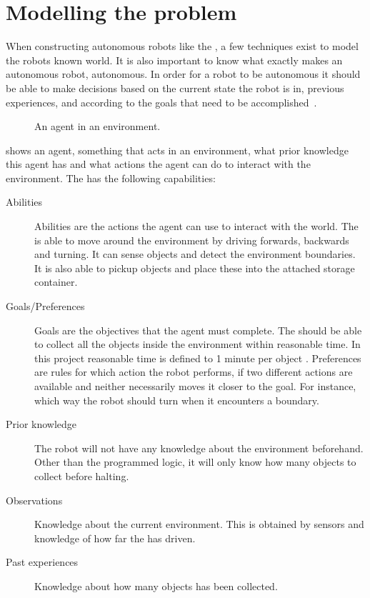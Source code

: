 \section{Modelling the problem} \label{sec:model}

When constructing autonomous robots like the \projname{}, a few techniques exist to model the robots known world. It is also important to know what exactly makes an autonomous robot, autonomous. In order for a robot to be autonomous it should be able to make decisions based on the current state the robot is in, previous experiences, and according to the goals that need to be accomplished~\citep{artificialintelligencebook}. 

\begin{figure}[H]
     \caption{\label{fig:model_mi_agent} An agent in an environment.}
\end{figure}

 shows an agent, something that acts in an environment, what prior knowledge this agent has and what actions the agent can do to interact with the environment. The \projname{} has the following capabilities:

\begin{description}
\item[Abilities] Abilities are the actions the agent can use to interact with the world. The \projname{} is able to move around the environment by driving forwards, backwards and turning. It can sense objects and detect the environment boundaries. It is also able to pickup objects and place these into the attached storage container.  
\item[Goals/Preferences] Goals are the objectives that the agent must complete. The \projname{} should be able to collect all the objects inside the environment within reasonable time. In this project reasonable time is defined to 1 minute per object . Preferences are rules for which action the robot performs, if two different actions are available and neither necessarily moves it closer to the goal. For instance, which way the robot should turn when it encounters a boundary.
\item[Prior knowledge] The robot will not have any knowledge about the environment beforehand. Other than the programmed logic, it will only know how many objects to collect before halting.
\item[Observations] Knowledge about the current environment. This is obtained by sensors and knowledge of how far the \projname{} has driven. 
\item[Past experiences] Knowledge about how many objects has been collected. 
\end{description}

